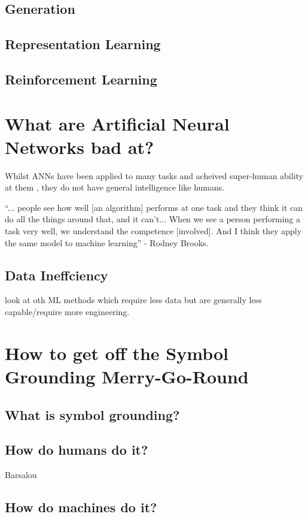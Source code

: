 \subsection{Generation}
\subsection{Representation Learning}
\subsection{Reinforcement Learning}


\section{What are Artificial Neural Networks bad at?}
Whilst ANNs have been applied to many tasks and acheived super-human ability at them \cite{vinyals2019alphastar}, they do not have general intelligence like humans.

\begin{displayquote}
``... people see how well [an algorithm] performs at one task and they think it can do all the things around that, and it can’t... When we see a person performing a task very well, we understand the competence [involved]. And I think they apply the same model to machine learning'' - Rodney Brooks.
\end{displayquote}
\subsection{Data Ineffciency}
look at oth ML methods which require less data but are generally less capable/require more engineering.


\section{How to get off the Symbol Grounding Merry-Go-Round} 
\subsection{What is symbol grounding?}
\subsection{How do humans do it?}
Barsalou

\subsection{How do machines do it?}

